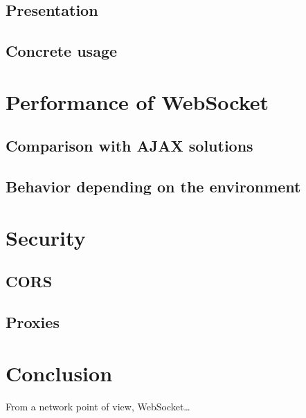 \documentclass[journal,compsoc]{IEEEtran}
\newcommand{\ws}{WebSocket}
\begin{document}
\subsection{Presentation}

\subsection{Concrete usage}



\section{Performance of \ws}

\subsection{Comparison with AJAX solutions}

\subsection{Behavior depending on the environment}



\section{Security}

\subsection{CORS}

\subsection{Proxies}



\section{Conclusion}

From a network point of view, \ws …


\ifCLASSOPTIONcaptionsoff
  \newpage
\fi




\end{document}
